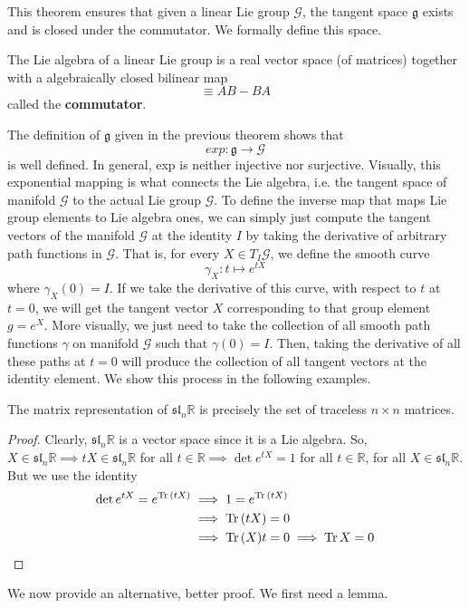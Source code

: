   This theorem ensures that given a linear Lie group $\mathcal{G}$, the tangent space $\mathfrak{g}$ exists and is closed under the commutator. We formally define this space. 

  \begin{definition}
    The Lie algebra of a linear Lie group is a real vector space (of matrices) together with a algebraically closed bilinear map 
    \begin{equation}
      [A,B] \equiv A B - B A
    \end{equation}
    called the \textbf{commutator}. 
  \end{definition} 

  The definition of $\mathfrak{g}$ given in the previous theorem shows that 
  \begin{equation}
    exp: \mathfrak{g} \rightarrow \mathcal{G}
  \end{equation}
  is well defined. In general, exp is neither injective nor surjective. Visually, this exponential mapping is what connects the Lie algebra, i.e. the tangent space of manifold $\mathcal{G}$ to the actual Lie group $\mathcal{G}$. To define the inverse map that maps Lie group elements to Lie algebra ones, we can simply just compute the tangent vectors of the manifold $\mathcal{G}$ at the identity $I$ by taking the derivative of arbitrary path functions in $\mathcal{G}$. That is, for every $X \in T_I \mathcal{G}$, we define the smooth curve 
  \begin{equation}
    \gamma_X: t \mapsto e^{tX}
  \end{equation}
  where $\gamma_X(0) = I$. If we take the derivative of this curve, with respect to $t$ at $t = 0$, we will get the tangent vector $X$ corresponding to that group element $g = e^{X}$. More visually, we just need to take the collection of all smooth path functions $\gamma$ on manifold $\mathcal{G}$ such that $\gamma(0) = I$. Then, taking the derivative of all these paths at $t = 0$ will produce the collection of all tangent vectors at the identity element. We show this process in the following examples. 

  \begin{theorem}
    The matrix representation of $\mathfrak{sl}_n \mathbb{R}$ is precisely the set of traceless $n \times n$ matrices. 
  \end{theorem}

  \begin{proof}
    Clearly, $\mathfrak{sl}_n \mathbb{R}$ is a vector space since it is a Lie algebra. So, $X \in \mathfrak{sl}_n \mathbb{R} \implies t X \in \mathfrak{sl}_n \mathbb{R}$ for all $t \in \mathbb{R} \implies \det{e^{tX}} = 1$ for all $t \in \mathbb{R}$, for all $X \in \mathfrak{sl}_n \mathbb{R}$. But we use the identity 
    \begin{align*}
      \det{e^{tX}} = e^{\Tr{(tX)}} & \implies 1 = e^{\Tr{(t X)}} \\
      & \implies \Tr{(tX)} = 0 \\
      & \implies \Tr{(X)} t = 0 \implies \Tr{X} = 0
    \end{align*}
  \end{proof}
  We now provide an alternative, better proof. We first need a lemma. 

